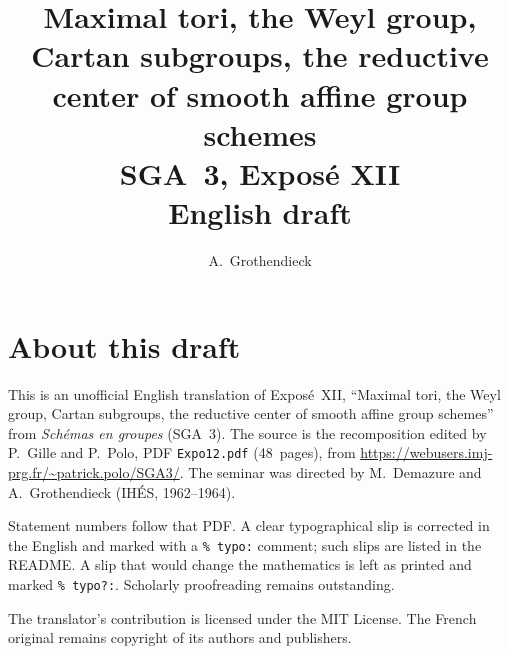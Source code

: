 \documentclass[11pt,a4paper,oneside]{amsbook}
\title[SGA~3, Expos\'e XII (English draft)]{Maximal tori, the Weyl group, Cartan subgroups, the reductive center of smooth affine group schemes\\
{\normalsize SGA~3, Expos\'e XII\\English draft}}
\author{A.\ Grothendieck}
\date{}
\begin{document}
\frontmatter
\maketitle

\chapter*{About this draft}
This is an unofficial English translation of Expos\'e~XII, ``Maximal tori, the Weyl group, Cartan subgroups, the reductive center of smooth affine group schemes''
from \textit{Sch\'emas en groupes} (SGA~3).
The source is the recomposition edited by P.~Gille and P.~Polo,
PDF \texttt{Expo12.pdf} (48~pages),
from \url{https://webusers.imj-prg.fr/~patrick.polo/SGA3/}.
The seminar was directed by M.~Demazure and A.~Grothendieck
(IH\'ES, 1962--1964).

Statement numbers follow that PDF. A clear typographical slip is
corrected in the English and marked with a \texttt{\% typo:} comment;
such slips are listed in the README. A slip that would change the
mathematics is left as printed and marked \texttt{\% typo?:}.
Scholarly proofreading remains outstanding.

The translator's contribution is licensed under the MIT License.
The French original remains copyright of its authors and publishers.

\tableofcontents
\mainmatter








\end{document}
